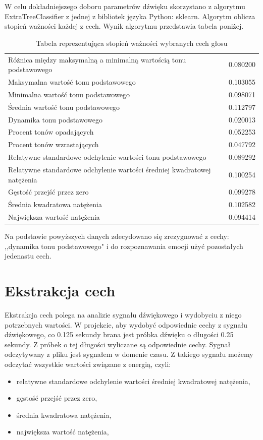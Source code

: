 \documentclass[declaration,shortabstract]{iithesis}
\begin{document}
W celu dokładniejszego doboru parametrów dźwięku skorzystano z algorytmu ExtraTreeClassifier z jednej z bibliotek języka Python: sklearn. Algorytm oblicza stopień ważności każdej z cech. Wynik algorytmu przedstawia tabela poniżej.

\begin{table}[t]
\caption{Tabela reprezentująca stopień ważności wybranych cech głosu}
\label{nazwa}
\begin{tabular}{ l | r }
Różnica między maksymalną a minimalną wartością tonu podstawowego & 0.080200 \\
Maksymalna wartość tonu podstawowego & 0.103055 \\
Minimalna wartość tonu podstawowego & 0.098071 \\
Średnia wartość tonu podstawowego & 0.112797 \\
Dynamika tonu podstawowego & 0.020013 \\
Procent tonów opadających & 0.052253 \\
Procent tonów wzrastających & 0.047792 \\
Relatywne standardowe odchylenie wartości tonu podstawowego & 0.089292 \\
Relatywne standardowe odchylenie wartości średniej kwadratowej natężenia & 0.100254 \\
Gęstość przejść przez zero & 0.099278 \\
Średnia kwadratowa natężenia & 0.102582 \\
Największa wartość natężenia & 0.094414 \\
\end{tabular}
\end{table}

Na podstawie powyższych danych zdecydowano się zrezygnować z cechy: ,,dynamika tonu podstawowego" i do rozpoznawania emocji użyć pozostałych jedenastu cech.

\section{Ekstrakcja cech}

Ekstrakcja cech polega na analizie sygnału dźwiękowego i wydobyciu z niego potrzebnych wartości. W projekcie, aby wydobyć odpowiednie cechy z sygnału dźwiękowego, co 0.125 sekundy brana jest próbka dźwięku o długości 0.25 sekundy. Z próbek o tej długości wyliczane są odpowiednie cechy. Sygnał odczytywany z pliku jest sygnałem w domenie czasu. Z takiego sygnału możemy odczytać wszystkie wartości związane z energią, czyli:
\begin{itemize}
\item relatywne standardowe odchylenie wartości średniej kwadratowej natężenia,
\item gęstość przejść przez zero,
\item średnia kwadratowa natężenia, 
\item największa wartość natężenia,
\end{itemize}
\end{document}
